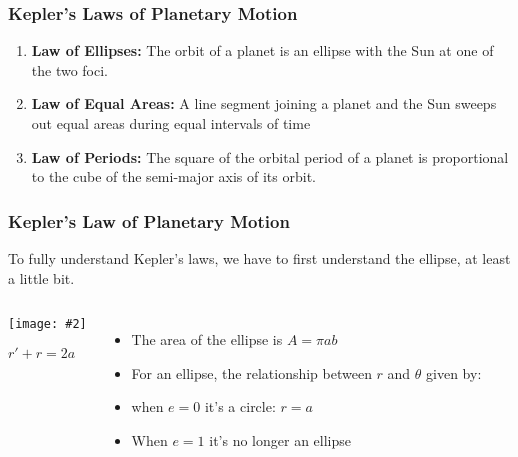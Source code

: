 \documentclass[12pt,compress,aspectratio=169]{beamer}
\newcommand{\pic}[2]{\texttt{[image: \#2]}}
\begin{document}
\begin{frame}
  \frametitle{Kepler's Laws of Planetary Motion}
  \begin{enumerate}
  \item\textbf{Law of Ellipses:} The orbit of a planet is an ellipse with the
    Sun at one of the two foci.
  \item\textbf{Law of Equal Areas:} A line segment joining a planet and the Sun
    sweeps out equal areas during equal intervals of time
  \item \textbf{Law of Periods:} The square of the orbital period of a planet
    is proportional to the cube of the semi-major axis of its orbit.
  \end{enumerate}
\end{frame}


\begin{frame}
  \frametitle{Kepler's Law of Planetary Motion}
  To fully understand Kepler's laws, we have to first understand the ellipse,
  at least a little bit.

  \begin{columns}
    \begin{center}
      \pic{1.25}{elliporb.png}
      
      $r' + r =2a$
    \end{center}
    \begin{itemize}
    \item The area of the ellipse is $A=\pi ab$
    \item For an ellipse, the relationship between $r$ and $\theta$ given by:

    \item when $e=0$ it's a circle: $r=a$
    \item When $e=1$ it's no longer an ellipse
    \end{itemize}
  \end{columns}
\end{frame}
\end{document}
